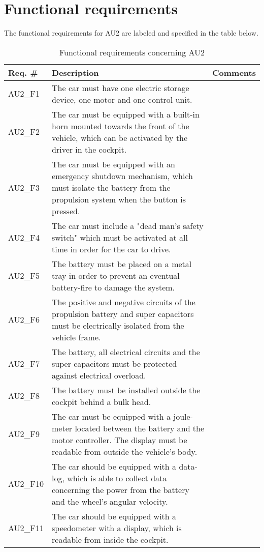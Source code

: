 \section{Functional requirements}
The functional requirements for AU2 are labeled and specified in the table below.

\begin{table}[h!]
	\label{FREQ_AU2}
	\centering
	\begin{tabular}{|p{2 cm}|p{7 cm}|p{4 cm}|}
		\hline
		\textbf{Req. \#} & \textbf{Description} & \textbf{Comments} \\\hline
		AU2\_F1		& The car must have one electric storage device, one motor and one control unit. &   \\\hline
		AU2\_F2		& The car must be equipped with a built-in horn mounted towards the front of the vehicle, which can be activated by the driver in the cockpit. &   \\\hline
		AU2\_F3		& The car must be equipped with an emergency shutdown mechanism, which must isolate the battery from the propulsion system when the button is pressed. &   \\\hline
		AU2\_F4		& The car must include a "dead man's safety switch" which must be activated at all time in order for the car to drive. &   \\\hline
		AU2\_F5		& The battery must be placed on a metal tray in order to prevent an eventual battery-fire to damage the system. &   \\\hline
		AU2\_F6		& The positive and negative circuits of the propulsion battery and super capacitors must be electrically isolated from the vehicle frame. &   \\\hline
		AU2\_F7		& The battery, all electrical circuits and the super capacitors must be protected against electrical overload. &   \\\hline
		AU2\_F8		& The battery must be installed outside the cockpit behind a bulk head. &   \\\hline
		AU2\_F9		& The car must be equipped with a joule-meter located between the battery and the motor controller. The display must be readable from outside the vehicle's body. &   \\\hline
		AU2\_F10	& The car should be equipped with a data-log, which is able to collect data concerning the power from the battery and the wheel's angular velocity. &   \\\hline
		AU2\_F11 \fxnote{Holder vi fast i dette?}	& The car should be equipped with a speedometer with a display, which is readable from inside the cockpit. &   \\\hline
	\end{tabular}
	\caption{Functional requirements concerning AU2}
\end{table}